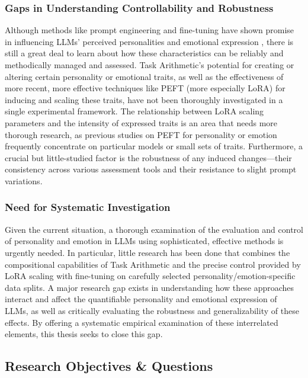 \documentclass{DESSThesis}
\begin{document}
\subsubsection{Gaps in Understanding Controllability and Robustness}
Although methods like prompt engineering and fine-tuning have shown promise in influencing LLMs' perceived personalities and emotional expression \cite{caron_identifying_2022,jiang_evaluating_2023,mao_editing_2024,chang_modeling_2024}, there is still a great deal to learn about how these characteristics can be reliably and methodically managed and assessed. Task Arithmetic's potential for creating or altering certain personality or emotional traits, as well as the effectiveness of more recent, more effective techniques like PEFT (more especially LoRA) for inducing and scaling these traits, have not been thoroughly investigated in a single experimental framework. The relationship between LoRA scaling parameters and the intensity of expressed traits is an area that needs more thorough research, as previous studies on PEFT for personality or emotion frequently concentrate on particular models or small sets of traits. Furthermore, a crucial but little-studied factor is the robustness of any induced changes—their consistency across various assessment tools and their resistance to slight prompt variations.

\subsubsection{Need for Systematic Investigation}
Given the current situation, a thorough examination of the evaluation and control of personality and emotion in LLMs using sophisticated, effective methods is urgently needed. In particular, little research has been done that combines the compositional capabilities of Task Arithmetic and the precise control provided by LoRA scaling with fine-tuning on carefully selected personality/emotion-specific data splits. A major research gap exists in understanding how these approaches interact and affect the quantifiable personality and emotional expression of LLMs, as well as critically evaluating the robustness and generalizability of these effects. By offering a systematic empirical examination of these interrelated elements, this thesis seeks to close this gap.

\subsection{Research Objectives \& Questions}
\end{document}
